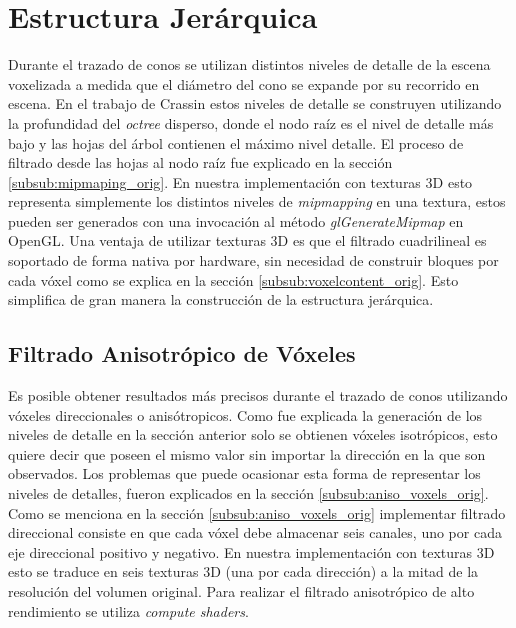 \section{Estructura Jerárquica} %
\label{sec:estructura_jerarquica}
Durante el trazado de conos se utilizan distintos niveles de detalle de la escena voxelizada a medida que el diámetro del cono se expande por su recorrido en escena. En el trabajo de Crassin estos niveles de detalle se construyen utilizando la profundidad del \emph{octree} disperso, donde el nodo raíz es el nivel de detalle más bajo y las hojas del árbol contienen el máximo nivel detalle. El proceso de filtrado desde las hojas al nodo raíz fue explicado en la sección \ref{subsub:mipmaping_orig}. En nuestra implementación con texturas 3D esto representa simplemente los distintos niveles de \emph{mipmapping} en una textura, estos pueden ser generados con una invocación al método \emph{glGenerateMipmap} en OpenGL. Una ventaja de utilizar texturas 3D es que el filtrado cuadrilineal es soportado de forma nativa por hardware, sin necesidad de construir bloques por cada vóxel como se explica en la sección \ref{subsub:voxelcontent_orig}. Esto simplifica de gran manera la construcción de la estructura jerárquica.

\subsection{Filtrado Anisotrópico de Vóxeles} %
\label{sub:mipmapping_direccioanl}
Es posible obtener resultados más precisos durante el trazado de conos utilizando vóxeles direccionales o anisótropicos. Como fue explicada la generación de los niveles de detalle en la sección anterior solo se obtienen vóxeles isotrópicos, esto quiere decir que poseen el mismo valor sin importar la dirección en la que son observados. Los problemas que puede ocasionar esta forma de representar los niveles de detalles, fueron explicados en la sección \ref{subsub:aniso_voxels_orig}.
Como se menciona en la sección \ref{subsub:aniso_voxels_orig} implementar filtrado direccional consiste en que cada vóxel debe almacenar seis canales, uno por cada eje direccional positivo y negativo. En nuestra implementación con texturas 3D esto se traduce en seis texturas 3D (una por cada dirección) a la mitad de la resolución del volumen original. Para realizar el filtrado anisotrópico de alto rendimiento se utiliza \emph{compute shaders}.
